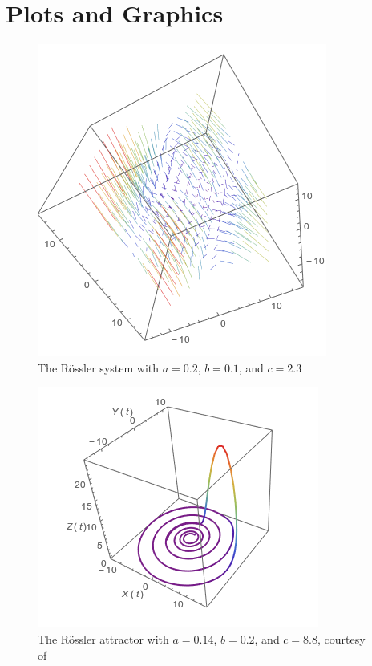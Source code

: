 \documentclass{article}
\begin{document}
\section*{Plots and Graphics}
\begin{figure}[h]
	\centering
	\includegraphics[scale=0.5]{vp_01.png}
	\caption{The R\"{o}ssler system with $a=0.2$, $b=0.1$, and $c=2.3$}
	\label{fig:3dsys_01}
\end{figure}

\begin{figure}[h]
	\centering
	\includegraphics[scale=0.7]{attractor_a0p14_b0p2_c8p8}
	\caption{The R\"{o}ssler attractor with $a=0.14$, $b=0.2$, and $c=8.8$, courtesy of \cite{rossler_wf}}
	\label{fig:3dsys_02}
\end{figure}
\end{document}
